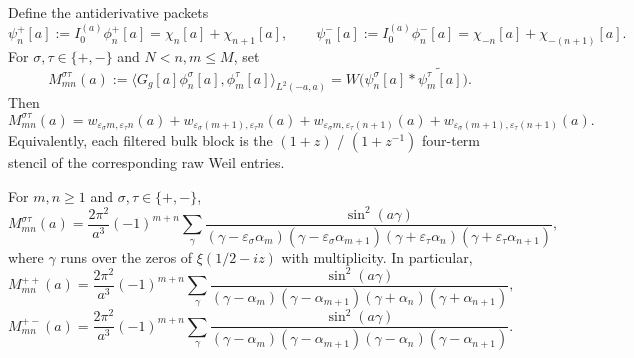 \begin{proposition}\label{prop:H1-raw-entry-reduction}
Define the antiderivative packets
\[
  \psi_n^+[a]:=I_0^{(a)}\phi_n^+[a]=\chi_n[a]+\chi_{n+1}[a],
  \qquad
  \psi_n^-[a]:=I_0^{(a)}\phi_n^-[a]=\chi_{-n}[a]+\chi_{-(n+1)}[a].
\]
For $\sigma,\tau\in\{+,-\}$ and $N<n,m\le M$, set
\[
  M_{mn}^{\sigma\tau}(a)
  :=
  \bigl\langle G_g[a]\phi_n^\sigma[a],\phi_m^\tau[a]\bigr\rangle_{L^2(-a,a)}
  =
  W\bigl(\psi_n^\sigma[a]*\widetilde{\psi_m^\tau[a]}\bigr).
\]
Then
\[
  M_{mn}^{\sigma\tau}(a)
  =
  w_{\varepsilon_\sigma m,\varepsilon_\tau n}(a)
  +
  w_{\varepsilon_\sigma(m+1),\varepsilon_\tau n}(a)
  +
  w_{\varepsilon_\sigma m,\varepsilon_\tau(n+1)}(a)
  +
  w_{\varepsilon_\sigma(m+1),\varepsilon_\tau(n+1)}(a).
\]
Equivalently, each filtered bulk block is the $(1+z)$ / $(1+z^{-1})$
four-term stencil of the corresponding raw Weil entries.
\end{proposition}

\begin{corollary}\label{cor:H1-raw-gamma-blocks}
For $m,n\ge 1$ and $\sigma,\tau\in\{+,-\}$,
\[
  M_{mn}^{\sigma\tau}(a)
  =
  \frac{2\pi^2}{a^3}(-1)^{m+n}
  \sum_{\gamma}
  \frac{\sin^2(a\gamma)}
  {(\gamma-\varepsilon_\sigma\alpha_m)
   (\gamma-\varepsilon_\sigma\alpha_{m+1})
   (\gamma+\varepsilon_\tau\alpha_n)
   (\gamma+\varepsilon_\tau\alpha_{n+1})},
\]
where $\gamma$ runs over the zeros of $\xi(1/2-iz)$ with multiplicity.
In particular,
\[
  M_{mn}^{++}(a)
  =
  \frac{2\pi^2}{a^3}(-1)^{m+n}
  \sum_\gamma
  \frac{\sin^2(a\gamma)}
  {(\gamma-\alpha_m)(\gamma-\alpha_{m+1})(\gamma+\alpha_n)(\gamma+\alpha_{n+1})},
\]
\[
  M_{mn}^{+-}(a)
  =
  \frac{2\pi^2}{a^3}(-1)^{m+n}
  \sum_\gamma
  \frac{\sin^2(a\gamma)}
  {(\gamma-\alpha_m)(\gamma-\alpha_{m+1})(\gamma-\alpha_n)(\gamma-\alpha_{n+1})}.
\]
\end{corollary}

